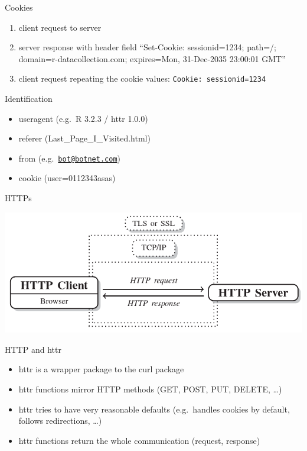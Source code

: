 \documentclass[ignorenonframetext,]{beamer}
\providecommand{\tightlist}{%
  \setlength{\itemsep}{0pt}\setlength{\parskip}{0pt}}
\begin{document}
\begin{frame}[fragile]{Cookies}

\begin{enumerate}
\def\labelenumi{\arabic{enumi})}
\tightlist
\item
  client request to server
\item
  server response with header field ``Set-Cookie: sessionid=1234;
  path=/; domain=r-datacollection.com; expires=Mon, 31-Dec-2035 23:00:01
  GMT''
\item
  client request repeating the cookie values:
  \texttt{Cookie:\ sessionid=1234}
\end{enumerate}

\end{frame}

\begin{frame}{Identification}

\begin{itemize}
\tightlist
\item
  useragent (e.g.~R 3.2.3 / httr 1.0.0)
\item
  referer (Last\_Page\_I\_Visited.html)
\item
  from (e.g.~\href{mailto:bot@botnet.com}{\nolinkurl{bot@botnet.com}})
\item
  cookie (user=0112343asas)
\end{itemize}

\end{frame}

\begin{frame}{HTTPs}

\includegraphics{fig/https.png}

\end{frame}

\begin{frame}{HTTP and httr}

\begin{itemize}
\tightlist
\item
  httr is a wrapper package to the curl package
\item
  httr functions mirror HTTP methods (GET, POST, PUT, DELETE, \ldots{})
\item
  httr tries to have very reasonable defaults (e.g.~handles cookies by
  default, follows redirections, \ldots{})
\item
  httr functions return the whole communication (request, response)
\end{itemize}

\end{frame}
\end{document}
